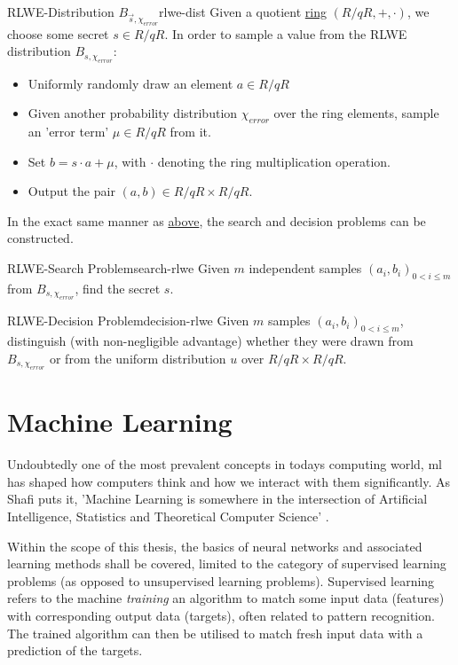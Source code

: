 \begin{corollary}{RLWE-Distribution $B_{\vec{s}, \chi_{error}}$}{rlwe-dist}
  Given a quotient \hyperref[def:ring]{ring} $(R/qR, +, \cdot)$, we choose some secret $s \in R/qR$.
  In order to sample a value from the RLWE distribution $B_{s, \chi_{error}}$:
  \begin{itemize}
    \item Uniformly randomly draw an element $a \in R/qR$
    \item Given another probability distribution $\chi_{error}$ over the ring elements,
          sample an 'error term' $\mu \in R/qR$ from it.
    \item Set $b = s \cdot a + \mu$, with $\cdot$ denoting the ring multiplication operation.
    \item Output the pair $(a, b) \in R/qR \times R/qR$.
  \end{itemize}
\end{corollary}

In the exact same manner as \hyperref[subsec:lwe]{above}, the search and decision problems can be constructed.

\begin{corollary}{RLWE-Search Problem}{search-rlwe}
  Given $m$ independent samples $(a_i, b_i)_{0 < i \leq m}$ from $B_{s, \chi_{error}}$, find the secret $s$.
\end{corollary}
\begin{corollary}{RLWE-Decision Problem}{decision-rlwe}
  Given $m$ samples $(a_i, b_i)_{0 < i \leq m}$, distinguish (with non-negligible advantage)
  whether they were drawn from $B_{s, \chi_{error}}$ or from the uniform distribution
  $u$ over $R/qR \times R/qR$.
\end{corollary}

\pagebreak
\section{Machine Learning}
Undoubtedly one of the most prevalent concepts in todays computing world, \gls{ml} has shaped how computers think and how we interact with them significantly.
As Shafi  puts it, 'Machine Learning is somewhere in the intersection of Artificial Intelligence, Statistics and Theoretical Computer Science' \parencite{goldwasserTalk2018}.

Within the scope of this thesis, the basics of neural networks and associated learning methods shall be covered, limited to the category of supervised learning problems (as opposed to unsupervised learning problems).
Supervised learning refers to the machine \textit{training} an algorithm to match some input data (features) with corresponding output data (targets), often related to pattern recognition.
The trained algorithm can then be utilised to match fresh input data with a prediction of the targets.

